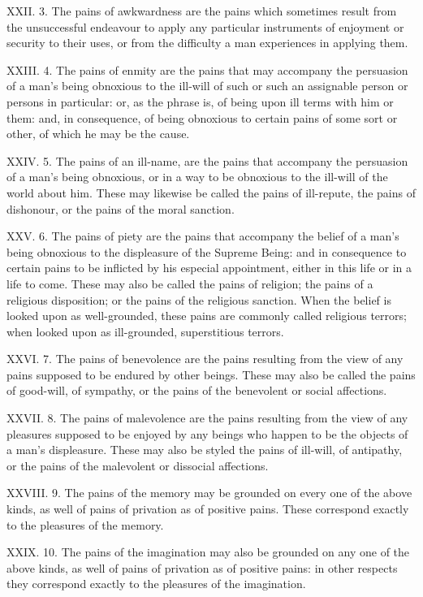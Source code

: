 \documentclass[12pt]{report}
\begin{document}
XXII. 3. The pains of awkwardness are the pains which sometimes result
from the unsuccessful endeavour to apply any particular instruments of
enjoyment or security to their uses, or from the difficulty a man
experiences in applying them.

XXIII. 4. The pains of enmity are the pains that may accompany the
persuasion of a man's being obnoxious to the ill-will of such or such an
assignable person or persons in particular: or, as the phrase is, of
being upon ill terms with him or them: and, in consequence, of being
obnoxious to certain pains of some sort or other, of which he may be the
cause.

XXIV. 5. The pains of an ill-name, are the pains that accompany the
persuasion of a man's being obnoxious, or in a way to be obnoxious to
the ill-will of the world about him. These may likewise be called the
pains of ill-repute, the pains of dishonour, or the pains of the moral
sanction.

XXV. 6. The pains of piety are the pains that accompany the belief of a
man's being obnoxious to the displeasure of the Supreme Being: and in
consequence to certain pains to be inflicted by his especial
appointment, either in this life or in a life to come. These may also be
called the pains of religion; the pains of a religious disposition; or
the pains of the religious sanction. When the belief is looked upon as
well-grounded, these pains are commonly called religious terrors; when
looked upon as ill-grounded, superstitious terrors.

XXVI. 7. The pains of benevolence are the pains resulting from the view
of any pains supposed to be endured by other beings. These may also be
called the pains of good-will, of sympathy, or the pains of the
benevolent or social affections.

XXVII. 8. The pains of malevolence are the pains resulting from the view
of any pleasures supposed to be enjoyed by any beings who happen to be
the objects of a man's displeasure. These may also be styled the pains
of ill-will, of antipathy, or the pains of the malevolent or dissocial
affections.

XXVIII. 9. The pains of the memory may be grounded on every one of the
above kinds, as well of pains of privation as of positive pains. These
correspond exactly to the pleasures of the memory.

XXIX. 10. The pains of the imagination may also be grounded on any one
of the above kinds, as well of pains of privation as of positive pains:
in other respects they correspond exactly to the pleasures of the
imagination.
\end{document}
